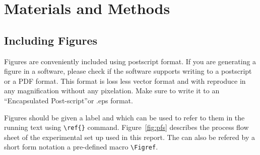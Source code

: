 
\chapter{Materials and Methods}

\section{Including Figures}

Figures are conveniently included using postscript format.  If you are
generating a figure in a software, please check if the software
supports writing to a postscript or a PDF format. This format is loss
less vector format and with reproduce in any magnification without any
pixelation. Make sure to write it to an ``Encapsulated Post-script''or
.eps format.



Figures should be given a label and which can be used to refer to them
in the running text using \verb|\ref{}| command. Figure~\ref{fig:pfs}
describes the process flow sheet of the experimental set up used in
this report. The  can also be refered by a short form notation
a pre-defined macro \verb"\Figref".



